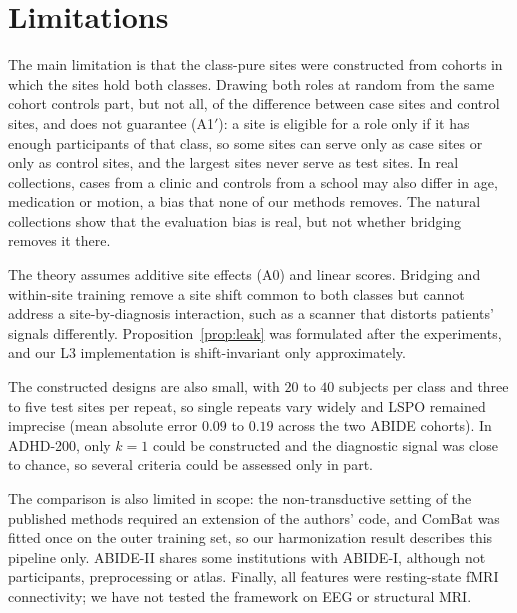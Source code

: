 \section{Limitations}\label{sec:limitations}

The main limitation is that the class-pure sites were constructed from cohorts in which the sites hold both classes. Drawing both roles at random from the same cohort controls part, but not all, of the difference between case sites and control sites, and does not guarantee (A1$'$): a site is eligible for a role only if it has enough participants of that class, so some sites can serve only as case sites or only as control sites, and the largest sites never serve as test sites. In real collections, cases from a clinic and controls from a school may also differ in age, medication or motion, a bias that none of our methods removes. The natural collections show that the evaluation bias is real, but not whether bridging removes it there.

The theory assumes additive site effects (A0) and linear scores. Bridging and within-site training remove a site shift common to both classes but cannot address a site-by-diagnosis interaction, such as a scanner that distorts patients' signals differently. Proposition~\ref{prop:leak} was formulated after the experiments, and our L3 implementation is shift-invariant only approximately.

The constructed designs are also small, with $20$ to $40$ subjects per class and three to five test sites per repeat, so single repeats vary widely and LSPO remained imprecise (mean absolute error $0.09$ to $0.19$ across the two ABIDE cohorts). In ADHD-200, only $k=1$ could be constructed and the diagnostic signal was close to chance, so several criteria could be assessed only in part.

The comparison is also limited in scope: the non-transductive setting of the published methods required an extension of the authors' code, and ComBat was fitted once on the outer training set, so our harmonization result describes this pipeline only. ABIDE-II shares some institutions with ABIDE-I, although not participants, preprocessing or atlas. Finally, all features were resting-state fMRI connectivity; we have not tested the framework on EEG or structural MRI.
